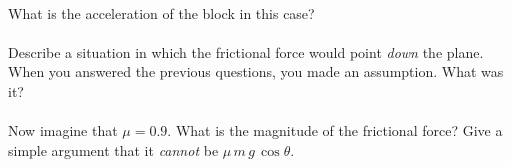 \documentclass[12pt]{article}
\begin{document}
\paragraph{\theproblem}%
What is the acceleration of the block in this case?

\paragraph{\theproblem}%
Describe a situation in which the frictional force would point
\emph{down} the plane.  When you answered the previous questions, you
made an assumption.  What was it?

\paragraph{\theproblem}%
Now imagine that $\mu=0.9$.  What is the magnitude of the frictional
force? Give a simple argument that it \emph{cannot} be
$\mu\,m\,g\,\cos\theta$.
\end{document}
